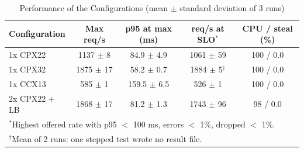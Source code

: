 \begin{table}[htbp]
\caption{Performance of the Configurations (mean $\pm$ standard deviation of 3 runs)}
\label{tab:perf}
\centering
\footnotesize
\setlength{\tabcolsep}{3pt}
\begin{tabular}{|l|c|c|c|c|}
\hline
\textbf{Configuration} & \textbf{Max req/s} & \textbf{p95 at max (ms)} & \textbf{req/s at SLO}$^*$ & \textbf{CPU / steal (\%)} \\
\hline
1x CPX22 & 1137 $\pm$ 8 & 84.9 $\pm$ 4.9 & 1061 $\pm$ 59 & 100 / 0.0 \\
\hline
1x CPX32 & 1875 $\pm$ 17 & 58.2 $\pm$ 0.7 & 1884 $\pm$ 5$^\dagger$ & 100 / 0.0 \\
\hline
1x CCX13 & 585 $\pm$ 1 & 159.5 $\pm$ 6.5 & 526 $\pm$ 1 & 100 / 0.0 \\
\hline
2x CPX22 + LB & 1868 $\pm$ 17 & 81.2 $\pm$ 1.3 & 1743 $\pm$ 96 & 98 / 0.0 \\
\hline
\multicolumn{5}{l}{$^*$Highest offered rate with p95 $<$ 100 ms, errors $<$ 1\%, dropped $<$ 1\%.} \\
\multicolumn{5}{l}{$^\dagger$Mean of 2 runs: one stepped test wrote no result file.} \\
\end{tabular}
\end{table}
